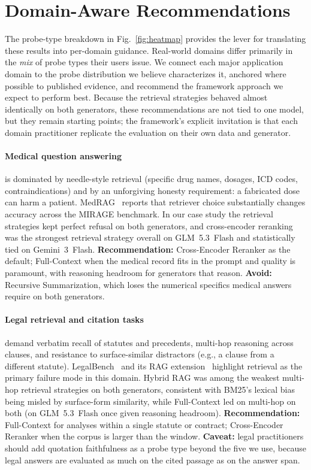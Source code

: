\documentclass[conference,a4paper,10pt]{IEEEtran}
\begin{document}
\section{Domain-Aware Recommendations}
\label{sec:domain}

The probe-type breakdown in Fig.~\ref{fig:heatmap} provides the lever for translating these results into per-domain guidance.
Real-world domains differ primarily in the \emph{mix} of probe types their users issue.
We connect each major application domain to the probe distribution we believe characterizes it, anchored where possible to published evidence, and recommend the framework approach we expect to perform best.
Because the retrieval strategies behaved almost identically on both generators, these recommendations are not tied to one model, but they remain starting points; the framework's explicit invitation is that each domain practitioner replicate the evaluation on their own data and generator.

\paragraph{Medical question answering} is dominated by needle-style retrieval (specific drug names, dosages, ICD codes, contraindications) and by an unforgiving honesty requirement: a fabricated dose can harm a patient.
MedRAG~\cite{xiong2024medrag} reports that retriever choice substantially changes accuracy across the MIRAGE benchmark.
In our case study the retrieval strategies kept perfect refusal on both generators, and cross-encoder reranking was the strongest retrieval strategy overall on GLM~5.3~Flash and statistically tied on Gemini~3~Flash.
\textbf{Recommendation:} Cross-Encoder Reranker as the default; Full-Context when the medical record fits in the prompt and quality is paramount, with reasoning headroom for generators that reason.
\textbf{Avoid:} Recursive Summarization, which loses the numerical specifics medical answers require on both generators.

\paragraph{Legal retrieval and citation tasks} demand verbatim recall of statutes and precedents, multi-hop reasoning across clauses, and resistance to surface-similar distractors (e.g., a clause from a different statute).
LegalBench~\cite{guha2023legalbench} and its RAG extension~\cite{pipitone2024legalbenchrag} highlight retrieval as the primary failure mode in this domain.
Hybrid RAG was among the weakest multi-hop retrieval strategies on both generators, consistent with BM25's lexical bias being misled by surface-form similarity, while Full-Context led on multi-hop on both (on GLM~5.3~Flash once given reasoning headroom).
\textbf{Recommendation:} Full-Context for analyses within a single statute or contract; Cross-Encoder Reranker when the corpus is larger than the window.
\textbf{Caveat:} legal practitioners should add quotation faithfulness as a probe type beyond the five we use, because legal answers are evaluated as much on the cited passage as on the answer span.
\end{document}
